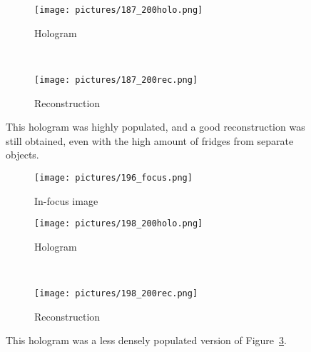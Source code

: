 \clearpage


\begin{figure}[ht!]
    \begin{center}

        \begin{subfigure}[t]{0.4\textwidth}
            \label{fig:187_200holo}
            \texttt{[image: pictures/187\_200holo.png]}
            \caption{Hologram}
        \end{subfigure}
        \\
        \begin{subfigure}[t]{\textwidth}
            \label{fig:187_200rec}
            \texttt{[image: pictures/187\_200rec.png]}
            \caption{Reconstruction}
        \end{subfigure}


    \end{center}
    \caption{%
        This hologram was highly populated, and a good reconstruction was still
        obtained, even with the high amount of fridges from separate objects.
    }%
    \label{fig:187_200}
\end{figure}

\clearpage


\begin{figure}[ht!]
    \begin{center}

        \begin{subfigure}[t]{0.4\textwidth}
            \label{fig:196_focus}
            \texttt{[image: pictures/196\_focus.png]}
            \caption{In-focus image}
        \end{subfigure}
        \begin{subfigure}[t]{0.4\textwidth}
            \label{fig:198_200holo}
            \texttt{[image: pictures/198\_200holo.png]}
            \caption{Hologram}
        \end{subfigure}
        \\
        \begin{subfigure}[t]{\textwidth}
            \label{fig:198_200rec}
            \texttt{[image: pictures/198\_200rec.png]}
            \caption{Reconstruction}
        \end{subfigure}


    \end{center}
    \caption{%
        This hologram was a less densely populated version of
        Figure~\ref{fig:187_200}.
    }%
    \label{fig:198_200}
\end{figure}

